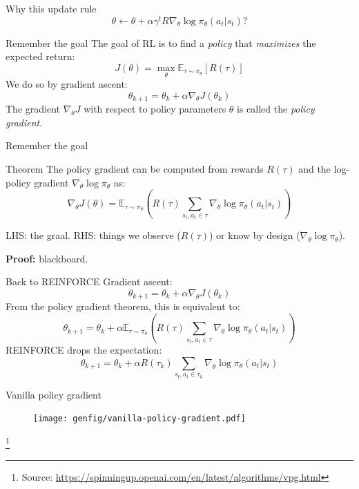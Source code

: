 \documentclass[11pt, aspectratio=169]{beamer}
\newcommand\blfootnote[1]{%
  \begingroup
  \renewcommand\thefootnote{}%
  \footnote{#1}%
  \addtocounter{footnote}{-1}%
  \endgroup
}
\begin{document}
\begin{frame}{Why this update rule}
    \LARGE
    $$
    \theta \leftarrow \theta + \alpha \gamma^t R \nabla_\theta \log \pi_\theta(a_t | s_t) ?
    $$
\end{frame}

\begin{frame}{Remember the goal}
    The goal of RL is to find a \emph{policy} that \emph{maximizes} the expected return:
    $$
    J(\theta) = \max_\theta \mathbb{E}_{\tau \sim \pi_\theta}[R(\tau)]
    $$
    We do so by gradient ascent:
    $$
    \theta_{k+1} = \theta_k + \alpha \nabla_\theta J(\theta_k)
    $$
    The gradient $\nabla_\theta J$ with respect to policy parameters $\theta$ is called the \emph{policy gradient}.
\end{frame}

\begin{frame}{Remember the goal}
    \begin{block}{Theorem}
        The policy gradient can be computed from rewards $R(\tau)$ and the log-policy gradient $\nabla_\theta \log \pi_\theta$ as:
        \begin{equation*}
            \nabla_\theta J(\theta) = \mathbb{E}_{\tau \sim \pi_\theta} \left( 
            R(\tau)
            \sum_{s_t, a_t \in \tau} \nabla_\theta \log \pi_\theta(a_t | s_t)
            \right)
        \end{equation*}
    \end{block}
    LHS: the graal. RHS: things we observe ($R(\tau)$) or know by design ($\nabla_\theta \log \pi_\theta$).

    \textbf{Proof:} blackboard.
\end{frame}

\begin{frame}{Back to REINFORCE}
    Gradient ascent:
    $$
    \theta_{k+1} = \theta_k + \alpha \nabla_\theta J(\theta_k)
    $$
    From the policy gradient theorem, this is equivalent to:
    $$
    \theta_{k+1} = \theta_k + \alpha \mathbb{E}_{\tau \sim \pi_\theta} \left( 
            R(\tau)
            \sum_{s_t, a_t \in \tau} \nabla_\theta \log \pi_\theta(a_t | s_t)
            \right)
    $$
    REINFORCE drops the expectation:
    $$
    \theta_{k+1} = \theta_k + \alpha R(\tau_k) \sum_{s_t, a_t \in \tau_k} \nabla_\theta \log \pi_\theta(a_t | s_t)
    $$
\end{frame}

\begin{frame}{Vanilla policy gradient}
    \begin{figure}
        \texttt{[image: genfig/vanilla-policy-gradient.pdf]}
    \end{figure}
    \vspace{-0.5cm}
    \blfootnote{
        Source: \url{https://spinningup.openai.com/en/latest/algorithms/vpg.html}
    }
\end{frame}
\end{document}
